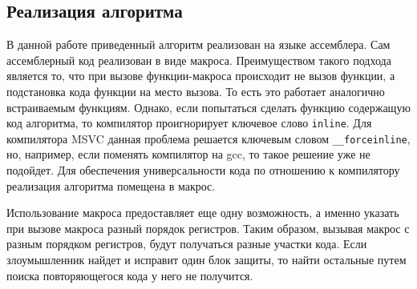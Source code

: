
\subsection{Реализация алгоритма}

В данной работе приведенный алгоритм реализован на языке ассемблера. Сам
ассемблерный код реализован в виде макроса. Преимуществом такого подхода
является то, что при вызове функции-макроса происходит не вызов функции, а
подстановка кода функции на место вызова. То есть это работает аналогично
встраиваемым функциям. Однако, если попытаться сделать функцию содержащую код
алгоритма, то компилятор проигнорирует ключевое слово \verb!inline!. Для
компилятора MSVC данная проблема решается ключевым словом \verb!__forceinline!,
но, например, если поменять компилятор на gcc, то такое решение уже не подойдет.
Для обеспечения универсальности кода по отношению к компилятору реализация
алгоритма помещена в макрос.

Использование макроса предоставляет еще одну возможность, а именно указать при
вызове макроса разный порядок регистров. Таким образом, вызывая макрос с разным
порядком регистров, будут получаться разные участки кода. Если злоумышленник
найдет и исправит один блок защиты, то найти остальные путем поиска
повторяющегося кода у него не получится.


